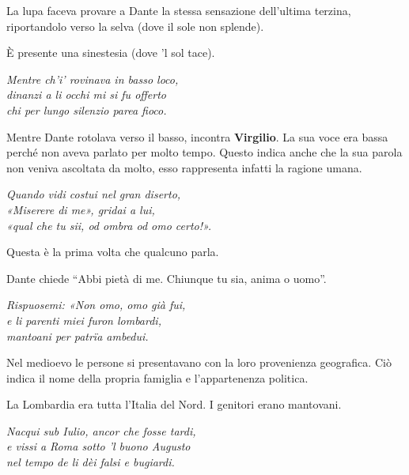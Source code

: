 \documentclass[a4paper]{article}
\newcommand{\quotes}[1]{``#1''}
\begin{document}
La lupa faceva provare a Dante la stessa sensazione dell'ultima terzina,
riportandolo verso la selva (dove il sole non splende).

È presente una sinestesia (dove 'l sol tace).

\begin{center}
    \textit{Mentre ch'i' rovinava in basso loco,} \\
    \textit{dinanzi a li occhi mi si fu offerto} \\
    \textit{chi per lungo silenzio parea fioco.}
\end{center}

Mentre Dante rotolava verso il basso, incontra \textbf{Virgilio}.
La sua voce era bassa perché non aveva parlato per molto tempo.
Questo indica anche che la sua parola non veniva ascoltata da molto,
esso rappresenta infatti la ragione umana.


\begin{center}
    \textit{Quando vidi costui nel gran diserto,} \\
    \textit{«Miserere di me», gridai a lui,} \\
    \textit{«qual che tu sii, od ombra od omo certo!».}
\end{center}

Questa è la prima volta che qualcuno parla.

Dante chiede \quotes{Abbi pietà di me. Chiunque tu sia, anima o uomo}.

\begin{center}
    \textit{Rispuosemi: «Non omo, omo già fui,} \\
    \textit{e li parenti miei furon lombardi,} \\
    \textit{mantoani per patrïa ambedui.}
\end{center}

Nel medioevo le persone si presentavano con la loro provenienza geografica.
Ciò indica il nome della propria famiglia e l'appartenenza politica.

La Lombardia era tutta l'Italia del Nord.
I genitori erano mantovani.

\begin{center}
    \textit{Nacqui sub Iulio, ancor che fosse tardi,} \\
    \textit{e vissi a Roma sotto 'l buono Augusto} \\
    \textit{nel tempo de li dèi falsi e bugiardi.}
\end{center}
\end{document}
